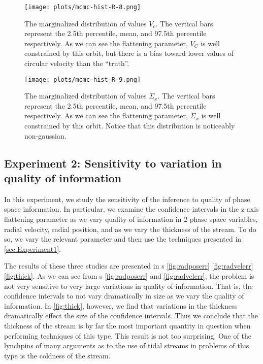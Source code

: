 \documentclass[12pt,preprint]{aastex}
\theoremstyle{plain}
\theoremstyle{definition}
\begin{document}
\begin{figure}[ht]
\begin{center}
\texttt{[image: plots/mcmc-hist-R-8.png]}
\caption{The marginalized distribution of values $V_c$. The vertical bars represent the 2.5th percentile, mean, and 97.5th percentile respectively. As we can see the flattening parameter, $V_C$ is well constrained by this orbit, but there is a bias toward lower values of circular velocity than the ``truth''. }
\label{fig:mcmchistVc}
\end{center}
\end{figure}
\begin{figure}[ht]
\begin{center}
\texttt{[image: plots/mcmc-hist-R-9.png]}
\caption{The marginalized distribution of values $\Sigma_x$. The vertical bars represent the 2.5th percentile, mean, and 97.5th percentile respectively. As we can see the flattening parameter, $\Sigma_x$ is well constrained by this orbit. Notice that this distribution is noticeably non-gaussian.}
\label{fig:mcmchistSigmax}
\end{center}
\end{figure}

\subsection{ \label{sec:Experiment2} Experiment 2: Sensitivity to variation in quality of information}
In this experiment, we study the sensitivity of the inference to quality of phase space information. In particular, we examine the confidence intervals in the z-axis flattening parameter as we vary quality of information in 2 phase space variables, radial velocity, radial position, and as we vary the thickness of the stream. To do so, we vary the relevant parameter and then use the techniques presented in \ref{sec:Experiment1}.

The results of these three studies are presented in \figurename s \ref{fig:radposerr} \ref{fig:radvelerr} \ref{fig:thick}. As we can see from \figurename s \ref{fig:radposerr}  and \ref{fig:radvelerr}, the problem is not very sensitive to very large variations in quality of information. That is, the confidence intervals to not vary dramatically in size as we vary the quality of information. In \figurename \ref{fig:thick}, however, we find that variations in the thickness dramatically effect the size of the confidence intervals. Thus we conclude that the thickness of the stream is by far the most important quantity in question when performing techniques of this type. This result is not too surprising. One of the lynchpins of many arguments as to the use of tidal streams in problems of this type is the coldness of the stream.
\end{document}
